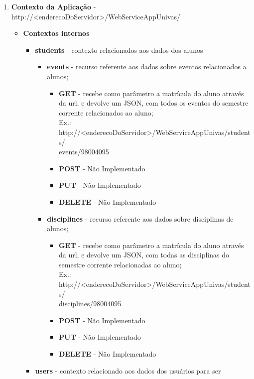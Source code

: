 \begin{enumerate}
	\item \textbf{Contexto da Aplicação} -
	http://<enderecoDoServidor>/WebServiceAppUnivas/
		\begin{itemize}
			\item \textbf{Contextos internos}
				\begin{itemize}
					\item \textbf{students} - contexto relacionados aos dados dos alunos
							\begin{itemize}
								
								\item \textbf{events} - recurso referente aos dados sobre eventos
								relacionados a alunos;
									\begin{itemize}
									  \item \textbf{GET} - recebe como parâmetro a matrícula do aluno
									  através da url, e devolve um JSON, com todos os eventos do semestre corrente
									  relacionados ao aluno;\\ Ex.: 
									  http://<enderecoDoServidor>/WebServiceAppUnivas/students/\\events/98004095
									  \item \textbf{POST} - Não Implementado
									  \item \textbf{PUT} - Não Implementado
									  \item \textbf{DELETE} - Não Implementado
									\end{itemize}									
								\item \textbf{disciplines} - recurso referente aos dados sobre
								disciplinas de alunos;
									\begin{itemize}
									  \item \textbf{GET} - recebe como parâmetro a matrícula do aluno
									  através da url, e devolve um JSON, com todas as disciplinas do semestre
									  corrente relacionadas ao aluno;\\ Ex.: 
									  http://<enderecoDoServidor>/WebServiceAppUnivas/students/\\disciplines/98004095
									  \item \textbf{POST} - Não Implementado
									  \item \textbf{PUT} - Não Implementado
									  \item \textbf{DELETE} - Não Implementado
									\end{itemize}
							\end{itemize}
					\item \textbf{users} - contexto relacionado aos dados dos usuários para ser

\end{itemize}
\end{itemize}
\end{enumerate}

